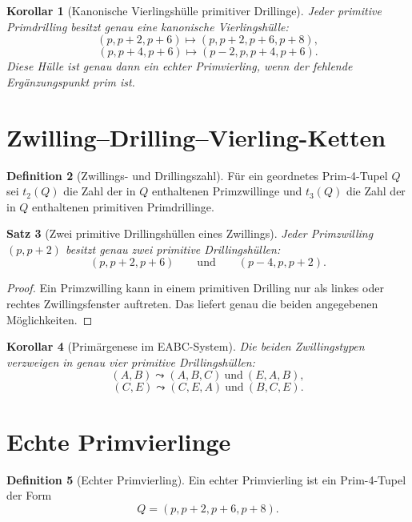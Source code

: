 \documentclass[12pt,a4paper]{article}
\newtheorem{satz}{Satz}[section]
\newtheorem{korollar}[satz]{Korollar}
\theoremstyle{definition}
\newtheorem{definition}[satz]{Definition}
\theoremstyle{remark}
\begin{document}
	\begin{korollar}[Kanonische Vierlingshülle primitiver Drillinge]
		Jeder primitive Primdrilling besitzt genau eine kanonische Vierlingshülle:
		\[
		(p,p+2,p+6)\longmapsto(p,p+2,p+6,p+8),
		\]
		\[
		(p,p+4,p+6)\longmapsto(p-2,p,p+4,p+6).
		\]
		Diese Hülle ist genau dann ein echter Primvierling, wenn der fehlende Ergänzungspunkt prim ist.
	\end{korollar}
	
	\section{Zwilling--Drilling--Vierling-Ketten}
	
	\begin{definition}[Zwillings- und Drillingszahl]
		Für ein geordnetes Prim-4-Tupel \(Q\) sei \(t_2(Q)\) die Zahl der in \(Q\) enthaltenen Primzwillinge und \(t_3(Q)\) die Zahl der in \(Q\) enthaltenen primitiven Primdrillinge.
	\end{definition}
	
	\begin{satz}[Zwei primitive Drillingshüllen eines Zwillings]
		Jeder Primzwilling \((p,p+2)\) besitzt genau zwei primitive Drillingshüllen:
		\[
		(p,p+2,p+6)
		\qquad\text{und}\qquad
		(p-4,p,p+2).
		\]
	\end{satz}
	
	\begin{proof}
		Ein Primzwilling kann in einem primitiven Drilling nur als linkes oder rechtes Zwillingsfenster auftreten. Das liefert genau die beiden angegebenen Möglichkeiten.
	\end{proof}
	
	\begin{korollar}[Primärgenese im EABC-System]
		Die beiden Zwillingstypen verzweigen in genau vier primitive Drillingshüllen:
		\[
		(A,B)\leadsto(A,B,C)\ \text{und}\ (E,A,B),
		\]
		\[
		(C,E)\leadsto(C,E,A)\ \text{und}\ (B,C,E).
		\]
	\end{korollar}
	
	\section{Echte Primvierlinge}
	
	\begin{definition}[Echter Primvierling]
		Ein echter Primvierling ist ein Prim-4-Tupel der Form
		\[
		Q=(p,p+2,p+6,p+8).
		\]
	\end{definition}
	
\end{document}

